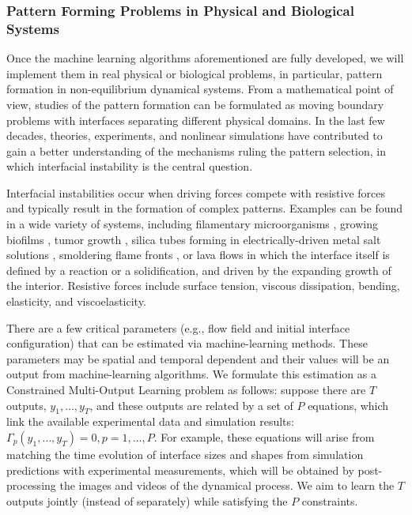 \subsubsection{Pattern Forming Problems in Physical and Biological Systems}
Once the machine learning algorithms aforementioned are fully developed, we will implement them in real physical or biological problems, in particular, pattern formation in non-equilibrium dynamical systems.  From
a mathematical point of view, studies of the pattern formation can be
formulated as moving boundary problems with interfaces separating
different physical  domains.  In the last few decades, theories,
experiments, and nonlinear simulations have contributed to gain a
better understanding of the mechanisms ruling the pattern selection,
in which interfacial instability is the central question. 

Interfacial instabilities occur when driving forces compete with resistive forces and typically result in the formation of complex patterns. Examples can be found in a wide
variety of systems, including filamentary microorganisms \cite{alain},
growing biofilms \cite{dockery01,Mattei2018}, tumor growth  \cite{MJ2020,Kara2018}, silica tubes forming in electrically-driven metal salt solutions \cite{steinbock03,steinbock16}, smoldering flame fronts
\cite{zik98,Kagan2008}, or lava flows \cite{balmforth00, griffiths00,Roman2021} in which
the interface itself is defined by a reaction or a solidification, and
driven by the expanding growth of the interior. Resistive forces include surface tension, viscous dissipation, bending, elasticity, and viscoelasticity.

There are a few critical parameters (e.g., flow field and initial interface configuration) that can  be estimated via machine-learning methods. These parameters may be spatial and temporal dependent and their values will be an output from machine-learning algorithms. We formulate this estimation as a Constrained Multi-Output Learning problem as follows: suppose there are $T$ outputs, $y_1, \ldots, y_T$, and these outputs are related by a set of  $P$ equations, which link the available experimental data and simulation results: $\Gamma_p(y_1, \ldots, y_T)=0, p=1, \ldots, P$. For example, these equations will arise from matching the time evolution of interface sizes and shapes from simulation predictions with experimental measurements, which will be obtained by post-processing the images and videos of the  dynamical process. We aim to learn the $T$ outputs jointly (instead of separately) while satisfying the $P$ constraints. 

